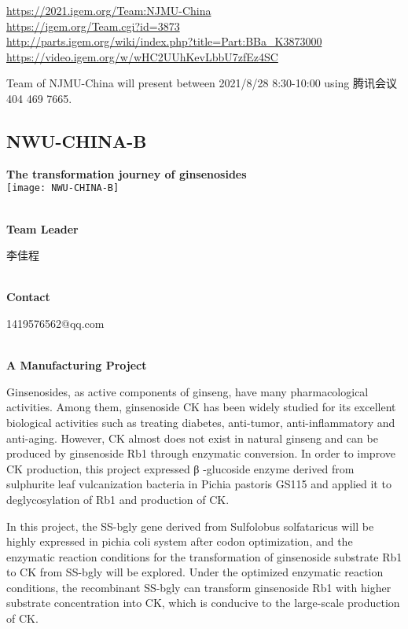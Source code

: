 \url{https://2021.igem.org/Team:NJMU-China }\\
\url{https://igem.org/Team.cgi?id=3873 }\\
\url{http://parts.igem.org/wiki/index.php?title=Part:BBa_K3873000 }\\
\url{https://video.igem.org/w/wHC2UUhKevLbbU7zfEz4SC }\\

\vfill{}









Team of NJMU-China will present between    2021/8/28 8:30-10:00     using 腾讯会议 404 469 7665.
\newpage


\subsection{\textcolor{Blu}{ NWU-CHINA-B } }
\vspace{5mm}
\begin{center}
\large{
  \textbf{ The transformation journey of ginsenosides }\\
  \texttt{[image: NWU-CHINA-B]}
}
\end{center}
\textbf{\\Team Leader}

  李佳程


\textbf{\\Contact}

  1419576562@qq.com


\textbf{\\A Manufacturing Project\\}\begin{spacing}{1.5}

Ginsenosides, as active components of ginseng, have many pharmacological activities. Among them, ginsenoside CK has been widely studied for its excellent biological activities such as treating diabetes, anti-tumor, anti-inflammatory and anti-aging. However, CK almost does not exist in natural ginseng and can be produced by ginsenoside Rb1 through enzymatic conversion. In order to improve CK production, this project expressed β -glucoside enzyme derived from sulphurite leaf vulcanization bacteria in Pichia pastoris GS115 and applied it to deglycosylation of Rb1 and production of CK.

In this project, the SS-bgly gene derived from Sulfolobus solfataricus will be highly expressed in pichia coli system after codon optimization, and the enzymatic reaction conditions for the transformation of ginsenoside substrate Rb1 to CK from SS-bgly will be explored. Under the optimized enzymatic reaction conditions, the recombinant SS-bgly can transform ginsenoside Rb1 with higher substrate concentration into CK, which is conducive to the large-scale production of CK.\end{spacing}
\\

